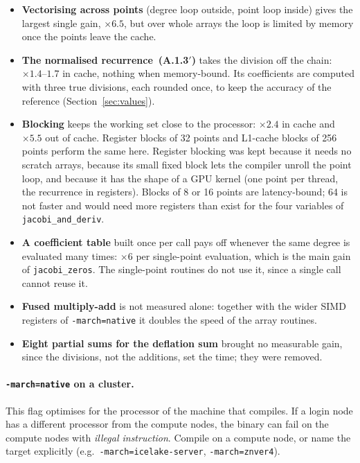 \documentclass[11pt,a4paper]{article}
\newcommand{\code}[1]{\texttt{#1}}
\begin{document}
\begin{itemize}
\item \textbf{Vectorising across points} (degree loop outside, point loop
inside) gives the largest single gain, $\times6.5$, but over whole arrays the
loop is limited by memory once the points leave the cache.
\item \textbf{The normalised recurrence~(A.1.3$'$)} takes the division off
the chain: $\times1.4$--$1.7$ in cache, nothing when memory-bound. Its
coefficients are computed with three true divisions, each rounded once, to
keep the accuracy of the reference (Section~\ref{sec:values}).
\item \textbf{Blocking} keeps the working set close to the processor:
$\times2.4$ in cache and $\times5.5$ out of cache. Register blocks of 32 points
and L1-cache blocks of 256 points perform the same here. Register blocking was
kept because it needs no scratch arrays, because its small fixed block lets
the compiler unroll the point loop, and because it has the shape of a GPU
kernel (one point per thread, the recurrence in registers). Blocks of 8 or 16
points are latency-bound; 64 is not faster and would need more registers than
exist for the four variables of \code{jacobi\_and\_deriv}.
\item \textbf{A coefficient table} built once per call pays off whenever the
same degree is evaluated many times: $\times6$ per single-point evaluation,
which is the main gain of \code{jacobi\_zeros}. The single-point routines do
not use it, since a single call cannot reuse it.
\item \textbf{Fused multiply-add} is not measured alone: together with the
wider SIMD registers of \code{-march=native} it doubles the speed of the
array routines.
\item \textbf{Eight partial sums for the deflation sum} brought no
measurable gain, since the divisions, not the additions, set the time; they
were removed.
\end{itemize}

\paragraph{\code{-march=native} on a cluster.}
This flag optimises for the processor of the machine that compiles. If a
login node has a different processor from the compute nodes, the binary can
fail on the compute nodes with \emph{illegal instruction}. Compile on a
compute node, or name the target explicitly (e.g.\
\code{-march=icelake-server}, \code{-march=znver4}).
\end{document}
